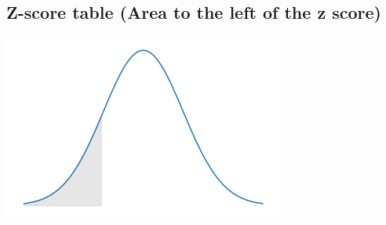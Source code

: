 \documentclass[]{article}
\begin{document}
\pagebreak
\begin{center}
    \section*{Z-score table (Area to the left of the z score)}
    \includegraphics*[scale=0.5]{z-score-graph.png}


\end{center}
\end{document}
